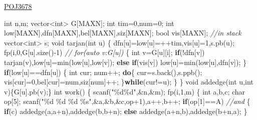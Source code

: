 \documentclass[
]{article}
\newenvironment{Shaded}{}{}
\newcommand{\CharTok}[1]{\textcolor[rgb]{0.25,0.44,0.63}{#1}}
\newcommand{\CommentTok}[1]{\textcolor[rgb]{0.38,0.63,0.69}{\textit{#1}}}
\newcommand{\ControlFlowTok}[1]{\textcolor[rgb]{0.00,0.44,0.13}{\textbf{#1}}}
\newcommand{\DataTypeTok}[1]{\textcolor[rgb]{0.56,0.13,0.00}{#1}}
\newcommand{\DecValTok}[1]{\textcolor[rgb]{0.25,0.63,0.44}{#1}}
\newcommand{\NormalTok}[1]{#1}
\newcommand{\SpecialCharTok}[1]{\textcolor[rgb]{0.25,0.44,0.63}{#1}}
\newcommand{\StringTok}[1]{\textcolor[rgb]{0.25,0.44,0.63}{#1}}
\begin{document}
\href{https://vjudge.net/problem/POJ-3678}{POJ3678}

\begin{Shaded}
\begin{Highlighting}[]
\DataTypeTok{int}\NormalTok{ n,m;}
\NormalTok{vector\textless{}}\DataTypeTok{int}\NormalTok{\textgreater{} G[MAXN];}
\DataTypeTok{int}\NormalTok{ tim=}\DecValTok{0}\NormalTok{,num=}\DecValTok{0}\NormalTok{;}
\DataTypeTok{int}\NormalTok{ low[MAXN],dfn[MAXN],bel[MAXN],siz[MAXN];}
\DataTypeTok{bool}\NormalTok{ vis[MAXN]; }\CommentTok{//in stack}
\NormalTok{vector\textless{}}\DataTypeTok{int}\NormalTok{\textgreater{} s;}
\DataTypeTok{void}\NormalTok{ tarjan(}\DataTypeTok{int}\NormalTok{ u)}
\NormalTok{\{}
\NormalTok{    dfn[u]=low[u]=++tim,vis[u]=}\DecValTok{1}\NormalTok{,s.pb(u);    }
\NormalTok{    fp(i,}\DecValTok{0}\NormalTok{,G[u].size(){-}}\DecValTok{1}\NormalTok{)}
    \CommentTok{// for(auto v:G[u])}
\NormalTok{    \{}
        \DataTypeTok{int}\NormalTok{ v=G[u][i];}
        \ControlFlowTok{if}\NormalTok{(!dfn[v]) tarjan(v),low[u]=min(low[u],low[v]);}
        \ControlFlowTok{else} \ControlFlowTok{if}\NormalTok{(vis[v]) low[u]=min(low[u],dfn[v]);}
\NormalTok{    \}}
    \ControlFlowTok{if}\NormalTok{(low[u]==dfn[u])}
\NormalTok{    \{}
        \DataTypeTok{int}\NormalTok{ cur; num++;}
        \ControlFlowTok{do}\NormalTok{\{}
\NormalTok{            cur=s.back(),s.ppb();}
\NormalTok{            vis[cur]=}\DecValTok{0}\NormalTok{,bel[cur]=num,siz[num]++;}
\NormalTok{        \}}\ControlFlowTok{while}\NormalTok{(cur!=u);}
\NormalTok{    \}}
\NormalTok{\}}
\DataTypeTok{void}\NormalTok{ addedge(}\DataTypeTok{int}\NormalTok{ u,}\DataTypeTok{int}\NormalTok{ v)\{G[u].pb(v);\}}
\DataTypeTok{int}\NormalTok{ work()}
\NormalTok{\{}
\NormalTok{    scanf(}\StringTok{"}\SpecialCharTok{\%d\%d}\StringTok{"}\NormalTok{,\&n,\&m);}
\NormalTok{    fp(i,}\DecValTok{1}\NormalTok{,m)}
\NormalTok{    \{}
        \DataTypeTok{int}\NormalTok{ a,b,c; }\DataTypeTok{char}\NormalTok{ op[}\DecValTok{5}\NormalTok{];}
\NormalTok{        scanf(}\StringTok{"}\SpecialCharTok{\%d}\StringTok{ }\SpecialCharTok{\%d}\StringTok{ }\SpecialCharTok{\%d}\StringTok{ }\SpecialCharTok{\%s}\StringTok{"}\NormalTok{,\&a,\&b,\&c,op+}\DecValTok{1}\NormalTok{),a++,b++;}
        \ControlFlowTok{if}\NormalTok{(op[}\DecValTok{1}\NormalTok{]==}\CharTok{\textquotesingle{}A\textquotesingle{}}\NormalTok{) }\CommentTok{//and}
\NormalTok{        \{}
            \ControlFlowTok{if}\NormalTok{(c) addedge(a,a+n),addedge(b,b+n);}
            \ControlFlowTok{else}\NormalTok{  addedge(a+n,b),addedge(b+n,a);}
\NormalTok{        \}}

\end{Highlighting}
\end{Shaded}
\end{document}
